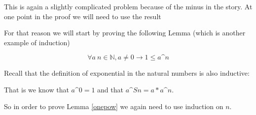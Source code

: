 This is again a slightly complicated problem because of the minus in the story. At one point  in the proof we will need to use the result

For that reason we will start by proving the following Lemma (which is another example of induction)
\begin{lemma}[onepow]\label{onepow}
$$\forall a \ n\in \mathbb{N}, a\ne 0 \rightarrow  1\le a\mbox{\textasciicircum }{n}$$
\end{lemma}

Recall that the definition of exponential in the natural numbers is also inductive:

That is we know that $a\mbox{\textasciicircum }0=1$ and that $a \mbox{\textasciicircum }{S n}= a* a\mbox{\textasciicircum }{n}$.

So in order to prove Lemma \ref{onepow} we again need to use induction on $n$.

